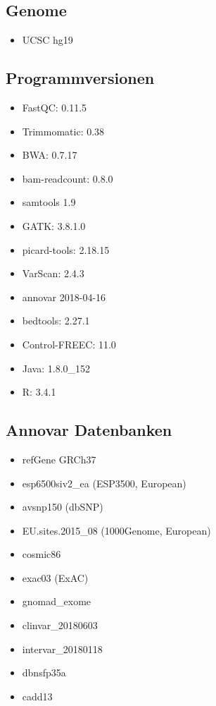 \documentclass[woside,a4paper,12pt]{article}\usepackage[]{graphicx}\usepackage[]{color}
\begin{document}
\subsection{Genome}
\begin{itemize}
\item UCSC hg19
\end{itemize}

\subsection{Programmversionen}
\begin{itemize}
\item FastQC: 0.11.5
\item Trimmomatic: 0.38
\item BWA: 0.7.17
\item bam-readcount: 0.8.0
\item samtools 1.9
\item GATK: 3.8.1.0
\item picard-tools: 2.18.15
\item VarScan: 2.4.3
\item annovar 2018-04-16
\item bedtools: 2.27.1
\item Control-FREEC: 11.0
\item Java: 1.8.0\_152
\item R: 3.4.1
\end{itemize}

\subsection{Annovar Datenbanken}
\begin{itemize}
\item refGene GRCh37
\item esp6500siv2\_ea (ESP3500, European)
\item avsnp150 (dbSNP)
\item EU.sites.2015\_08 (1000Genome, European)
\item cosmic86
\item exac03 (ExAC)
\item gnomad\_exome
\item clinvar\_20180603
\item intervar\_20180118
\item dbnsfp35a
\item cadd13
\end{itemize}
\end{document}
